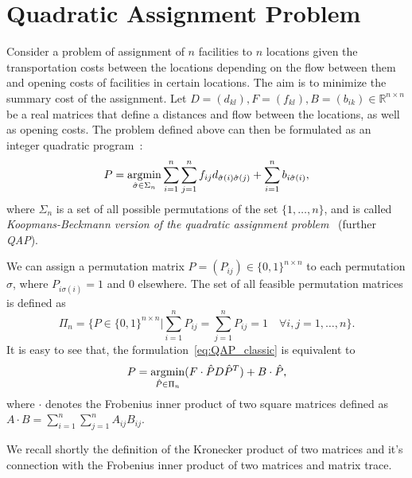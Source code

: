 \chapter{Quadratic Assignment Problem}\label{appendixA}
Consider a problem of assignment of $n$ facilities to $n$ locations given the transportation costs between the locations depending on the flow between them and opening costs of facilities in certain locations. The aim is to minimize the summary cost of the assignment. Let $D=(d_{kl}),F=(f_{kl}), B=(b_{ik})\in\mathbb{R}^{n\times n}$ be a real matrices that define a distances and flow between the locations, as well as opening costs. The problem defined above can then be formulated as an integer quadratic program~\cite{Burkard98thequadratic,Koopman_Backman}:
\begin{equation}\label{eq:QAP_classic}
P = \mathop{\rm argmin}_{\hat{\sigma}\in\Sigma_n}\sum_{i=1}^{n}\sum_{j=1}^{n}f_{ij}d_{\hat{\sigma}(i)\hat{\sigma}(j)}+\sum_{i=1}^{n}b_{i\hat{\sigma}(i)},
\end{equation}
where $\Sigma_n$ is a set of all possible permutations of the set $\{1,\dots,n\}$, and is called \emph{Koopmans-Beckmann version of the quadratic assignment problem}~\cite{Burkard98thequadratic} (further \emph{QAP}). %


We can assign a permutation matrix $P=(P_{ij})\in\{0,1\}^{n\times n}$ to each permutation $\sigma$, where $P_{i\sigma(i)}=1$ and $0$ elsewhere. The set of all feasible permutation matrices is defined as
\begin{equation*}
\Pi_n=\{P\in\{0,1\}^{n\times n}|\sum_{i=1}^{n}P_{ij}=\sum_{j=1}^{n}P_{ij}=1\quad\forall i,j=1,\dots,n\}.
\end{equation*}
It is easy to see that, the formulation~\eqref{eq:QAP_classic} %
is equivalent to
\begin{equation}\label{eq:QAP_classic2}
P = \mathop{\rm argmin}_{\hat{P}\in\Pi_n}(F\cdot \hat{P}D\hat{P}^T)+B\cdot\hat{P},
\end{equation}
where $\cdot$ denotes the Frobenius inner product of two square matrices defined as $A\cdot B=\sum_{i=1}^{n}\sum_{j=1}^{n}A_{ij}B_{ij}$.

We recall shortly the definition of the Kronecker product of two matrices and it's connection with the Frobenius inner product of two matrices and matrix trace.

